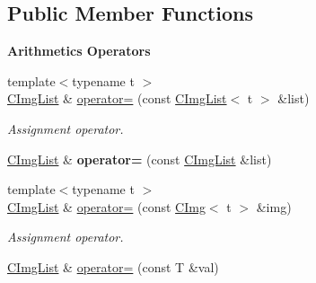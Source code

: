 \subsection*{Public Member Functions}
\begin{Indent}{\bf Arithmetics Operators}\par
\begin{DoxyCompactItemize}
\item 
\hypertarget{structcimg__library_1_1_c_img_list_a73b8e58cb0f78752c71ea5d94179de5b}{{\footnotesize template$<$typename t $>$ }\\\hyperlink{structcimg__library_1_1_c_img_list}{C\-Img\-List} \& \hyperlink{structcimg__library_1_1_c_img_list_a73b8e58cb0f78752c71ea5d94179de5b}{operator=} (const \hyperlink{structcimg__library_1_1_c_img_list}{C\-Img\-List}$<$ t $>$ \&list)}\label{structcimg__library_1_1_c_img_list_a73b8e58cb0f78752c71ea5d94179de5b}

\begin{DoxyCompactList}\small\item\em Assignment operator. \end{DoxyCompactList}\item 
\hypertarget{structcimg__library_1_1_c_img_list_a8d3e520f7e8ba35d6ce2c9dc09d34a4a}{\hyperlink{structcimg__library_1_1_c_img_list}{C\-Img\-List} \& {\bfseries operator=} (const \hyperlink{structcimg__library_1_1_c_img_list}{C\-Img\-List} \&list)}\label{structcimg__library_1_1_c_img_list_a8d3e520f7e8ba35d6ce2c9dc09d34a4a}

\item 
\hypertarget{structcimg__library_1_1_c_img_list_aec85f18ff33d5eff151a94fb3631c1de}{{\footnotesize template$<$typename t $>$ }\\\hyperlink{structcimg__library_1_1_c_img_list}{C\-Img\-List} \& \hyperlink{structcimg__library_1_1_c_img_list_aec85f18ff33d5eff151a94fb3631c1de}{operator=} (const \hyperlink{structcimg__library_1_1_c_img}{C\-Img}$<$ t $>$ \&img)}\label{structcimg__library_1_1_c_img_list_aec85f18ff33d5eff151a94fb3631c1de}

\begin{DoxyCompactList}\small\item\em Assignment operator. \end{DoxyCompactList}\item 
\hypertarget{structcimg__library_1_1_c_img_list_a272c5c22cc764b5fefdbc8538840c47a}{\hyperlink{structcimg__library_1_1_c_img_list}{C\-Img\-List} \& \hyperlink{structcimg__library_1_1_c_img_list_a272c5c22cc764b5fefdbc8538840c47a}{operator=} (const T \&val)}\label{structcimg__library_1_1_c_img_list_a272c5c22cc764b5fefdbc8538840c47a}


\end{DoxyCompactItemize}
\end{Indent}
